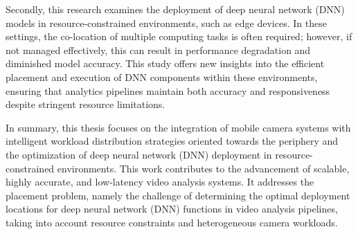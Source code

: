 Secondly, this research examines the deployment of deep neural network (DNN) models in resource-constrained environments, such as edge devices. In these settings, the co-location of multiple computing tasks is often required; however, if not managed effectively, this can result in performance degradation and diminished model accuracy. This study offers new insights into the efficient placement and execution of DNN components within these environments, ensuring that analytics pipelines maintain both accuracy and responsiveness despite stringent resource limitations.

In summary, this thesis focuses on the integration of mobile camera systems with intelligent workload distribution strategies oriented towards the periphery and the optimization of deep neural network (DNN) deployment in resource-constrained environments. This work contributes to the advancement of scalable, highly accurate, and low-latency video analysis systems.
It addresses the placement problem, namely the challenge of determining the optimal deployment locations for deep neural network (DNN) functions in video analysis pipelines, taking into account resource constraints and heterogeneous camera workloads.





